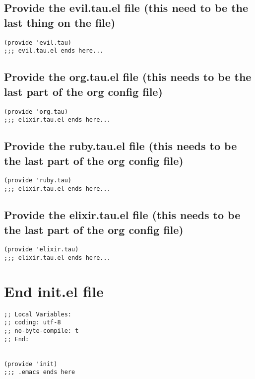 \documentclass[11pt]{article}
\begin{document}
\subsection*{Provide the evil.tau.el file (this need to be the last thing on the file)}
\label{sec:orgcd68534}

\begin{verbatim}
(provide 'evil.tau)
;;; evil.tau.el ends here...
\end{verbatim}

\subsection*{Provide the org.tau.el file (this needs to be the last part of the org config file)}
\label{sec:orgd843a7b}

\begin{verbatim}
(provide 'org.tau)
;;; elixir.tau.el ends here...
\end{verbatim}

\subsection*{Provide the ruby.tau.el file (this needs to be the last part of the org config file)}
\label{sec:org9c8aea8}

\begin{verbatim}
(provide 'ruby.tau)
;;; elixir.tau.el ends here...
\end{verbatim}

\subsection*{Provide the elixir.tau.el file (this needs to be the last part of the org config file)}
\label{sec:org7add388}

\begin{verbatim}
(provide 'elixir.tau)
;;; elixir.tau.el ends here...
\end{verbatim}


\section*{End init.el file}
\label{sec:orgff50ad9}
\begin{verbatim}
;; Local Variables:
;; coding: utf-8
;; no-byte-compile: t
;; End:


(provide 'init)
;;; .emacs ends here

\end{verbatim}
\end{document}

